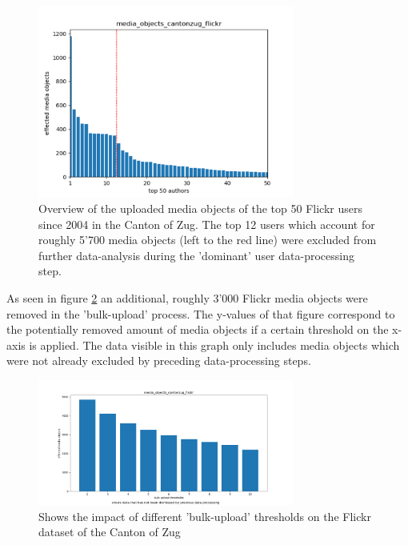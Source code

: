 \begin{figure}[h!]
   \centering
   \includegraphics[width=0.75\textwidth]{img/cantonzug_flickr_top50_w_line}
   \caption{Overview of the uploaded media objects of the top 50 Flickr users since 2004 in the Canton of Zug. The top 12 users which account for roughly 5'700 media objects (left to the red line) were excluded from further data-analysis during the 'dominant' user data-processing step.}
   \label{img:dominant_users_flickr}
\end{figure}

As seen in figure \ref{img:bulk_uploads_flickr} an additional, roughly 3'000 Flickr media objects were removed in the 'bulk-upload' process. The y-values of that figure correspond to the potentially removed amount of media objects if a certain threshold on the x-axis is applied. The data visible in this graph only includes media objects which were not already excluded by preceding data-processing steps.

\begin{figure}[h!]
   \centering
   \includegraphics[width=0.75\textwidth]{img/cantonzug_flickr_bulkuploads_cropped.pdf}
   \caption{Shows the impact of different 'bulk-upload' thresholds on the Flickr dataset of the Canton of Zug}
   \label{img:bulk_uploads_flickr}
\end{figure}

